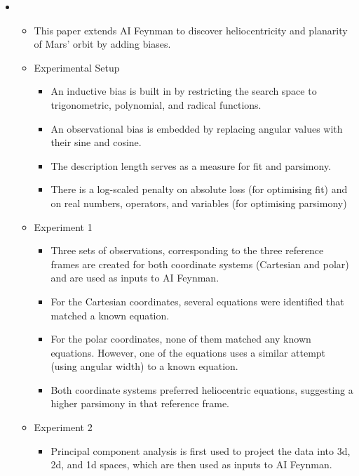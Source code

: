 \documentclass[fleqn,10pt]{olplainarticle}
\begin{document}
\begin{itemize}
    \item {}
          \begin{itemize}
              \item This paper extends AI Feynman to discover heliocentricity and planarity of Mars' orbit by adding biases.
              \item Experimental Setup
                    \begin{itemize}
                        \item An inductive bias is built in by restricting the search space to trigonometric, polynomial, and radical functions.
                        \item An observational bias is embedded by replacing angular values with their sine and cosine.
                        \item The description length serves as a measure for fit and parsimony.
                        \item There is a log-scaled penalty on absolute loss (for optimising fit) and on real numbers, operators, and variables (for optimising parsimony)
                    \end{itemize}
              \item Experiment 1
                    \begin{itemize}
                        \item Three sets of observations, corresponding to the three reference frames are created for both coordinate systems (Cartesian and polar) and are used as inputs to AI Feynman.
                        \item For the Cartesian coordinates, several equations were identified that matched a known equation.
                        \item For the polar coordinates, none of them matched any known equations. However, one of the equations uses a similar attempt (using angular width) to a known equation.
                        \item Both coordinate systems preferred heliocentric equations, suggesting a higher parsimony in that reference frame.
                    \end{itemize}
              \item Experiment 2
                    \begin {itemize}
                        \item Principal component analysis is first used to project the data into 3d, 2d, and 1d spaces, which are then used as inputs to AI Feynman.

\end{itemize}
\end{itemize}
\end{itemize}
\end{document}
